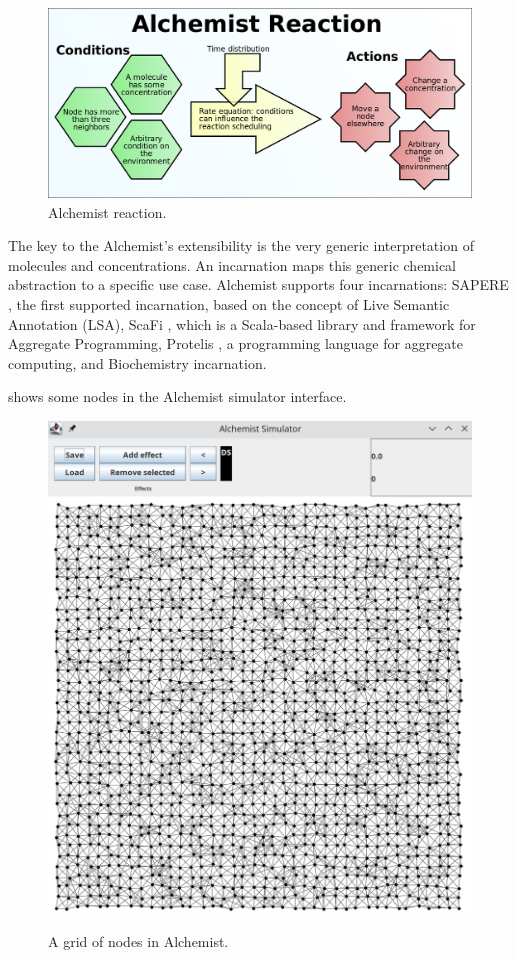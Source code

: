 \documentclass[12pt,a4paper,openright,twoside]{book}
\begin{document}
\begin{figure}[h!]
  \centering
  \includegraphics[width=\textwidth]{figures/alchemist-reaction.png}
  \caption{Alchemist reaction.}
  \label{fig:alchemist-reaction}
\end{figure}

The key to the Alchemist's extensibility is the very generic interpretation of molecules and concentrations. An incarnation maps this generic chemical abstraction to a specific use case.
Alchemist supports four incarnations:
SAPERE \cite{DBLP:conf/saso/CastelliMRZ11}, the first supported incarnation, based on the concept of Live Semantic Annotation (LSA),
ScaFi \cite{DBLP:journals/softx/CasadeiVAP22}, which is a Scala-based library and framework for Aggregate Programming,
Protelis \cite{DBLP:conf/sac/PianiniVB15}, a programming language for aggregate computing, and
Biochemistry incarnation.

 shows some nodes in the Alchemist simulator interface.

\begin{figure}[h!]
  \centering
  \includegraphics[width=\textwidth]{figures/alchemist.png}
  \label{fig:alchemist-interface}
  \caption{A grid of nodes in Alchemist.}
\end{figure}
\end{document}
